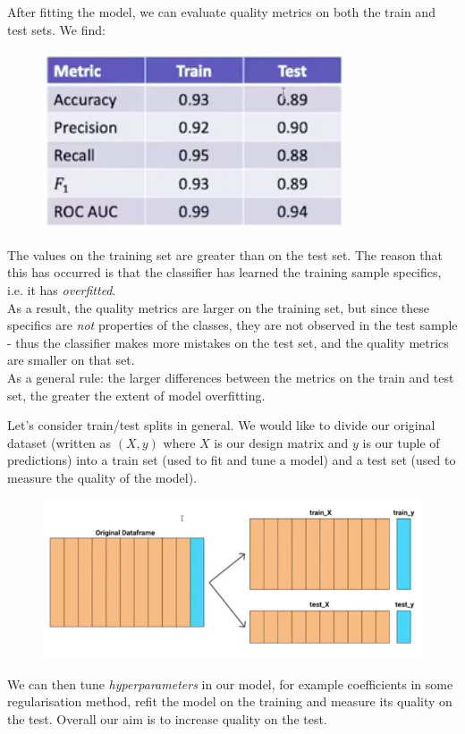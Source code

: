 \begin{frameex}
After fitting the model, we can evaluate quality metrics on both the train and test sets. We find:
\begin{figure}[H]
\centering
\includegraphics[scale=0.4]{testtrain.png}
\end{figure}
The values on the training set are greater than on the test set. The reason that this has occurred is that the classifier has learned the training sample specifics, i.e. it has \textit{overfitted}.\\

As a result, the quality metrics are larger on the training set, but since these specifics are \textit{not} properties of the classes, they are not observed in the test sample - thus the classifier makes more mistakes on the test set, and the quality metrics are smaller on that set.\\

As a general rule: the larger differences between the metrics on the train and test set, the greater the extent of model overfitting.
\end{frameex}



\newpage
Let's consider train/test splits in general. We would like to divide our original dataset (written as $(X,y)$ where $X$ is our design matrix and $y$ is our tuple of predictions) into a train set (used to fit and tune a model) and a test set (used to measure the quality of the model). 
\begin{figure}[H]
\centering
\includegraphics[scale=0.4]{traintestsplit.png}
\end{figure}
We can then tune \textit{hyperparameters} in our model, for example coefficients in some regularisation method, refit the model on the training and measure its quality on the test. Overall our aim is to increase quality on the test.\\

